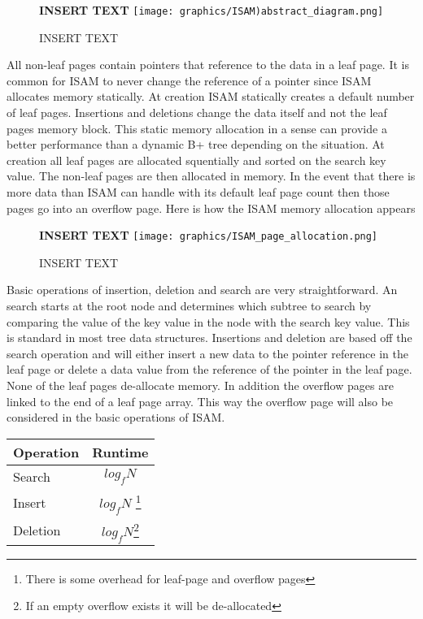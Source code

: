 \documentclass[letterpaper, 12pt]{article}
\begin{document}
\begin{figure}
  \centering
  \textbf{INSERT TEXT}
  \texttt{[image: graphics/ISAM)abstract\_diagram.png]}
  \caption{INSERT TEXT}
\end{figure}

All non-leaf pages contain pointers that reference to the data in a leaf page. It is common for 
ISAM to never change the reference of a pointer since ISAM allocates memory statically. At creation 
ISAM statically creates a default number of leaf pages. Insertions and deletions change the data 
itself and not the leaf pages memory block. This static memory allocation in a sense can 
provide a better performance than a dynamic B+ tree depending on the situation. At creation all 
leaf pages are allocated squentially and sorted on the search key value. The non-leaf pages 
are then allocated in memory. In the event that there is more data than ISAM can handle with its 
default leaf page count then those pages go into an overflow page. Here is how the ISAM memory 
allocation appears
\par\vspace{\baselineskip}

\begin{figure}
  \centering
  \textbf{INSERT TEXT}
  \texttt{[image: graphics/ISAM\_page\_allocation.png]}
  \caption{INSERT TEXT}
\end{figure}

Basic operations of insertion, deletion and search are very straightforward. An search starts at the 
root node and determines which subtree to search by comparing the value of the key value in the node 
with the search key value. This is standard in most tree data structures. Insertions and deletion are 
based off the search operation and will either insert a new data to the pointer reference in the leaf 
page or delete a data value from the reference of the pointer in the leaf page. None of the leaf
pages de-allocate memory. In addition the overflow pages are linked to the end of a leaf page array. 
This way the overflow page will also be considered in the basic operations of ISAM.
\par\vspace{\baselineskip}

\begin{center}
\begin{tabular}{l | c}
  \hline
  Operation & Runtime \\ \hline \hline
  Search & $ log_f N $ \\ \hline
  Insert & $ log_f N $ \footnote{There is some overhead for leaf-page and overflow pages} \\ \hline
  Deletion & $ log_f N $\footnote{If an empty overflow exists it will be de-allocated} \\ \hline
\end{tabular}
\end{center}
\end{document}
